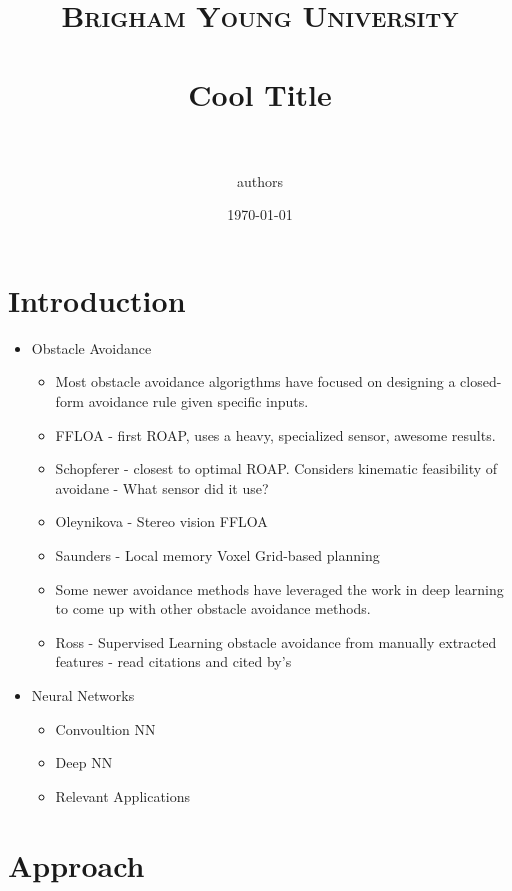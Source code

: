 \documentclass[paper=a4, fontsize=11pt]{scrartcl} %
\title{
\normalfont \normalsize
\textsc{Brigham Young University} \\ [25pt] %
\horrule{0.5pt} \\[0.4cm] %
\huge Cool Title \\ %
\horrule{2pt} \\[0.5cm] %
}
\author{authors} %
\date{\normalsize\today} %
\begin{document}
\maketitle %





\section{Introduction}
\begin{itemize}
	\item Obstacle Avoidance
	\begin{itemize}
		\item Most obstacle avoidance algorigthms have focused on designing a closed-form avoidance rule given specific inputs.
		\item FFLOA - first ROAP, uses a heavy, specialized sensor, awesome results.
		\item Schopferer - closest to optimal ROAP.  Considers kinematic feasibility of avoidane - What sensor did it use?
		\item Oleynikova - Stereo vision FFLOA
		\item Saunders - Local memory Voxel Grid-based planning
		\item Some newer avoidance methods have leveraged the work in deep learning to come up with other obstacle avoidance methods.
		\item Ross - Supervised Learning obstacle avoidance from manually extracted features - read citations and cited by's
	\end{itemize}
\end{itemize}

\begin{itemize}
	\item Neural Networks
	\begin{itemize}
		\item Convoultion NN
		\item Deep NN
		\item Relevant Applications
	\end{itemize}
\end{itemize}

\section{Approach}
\end{document}
